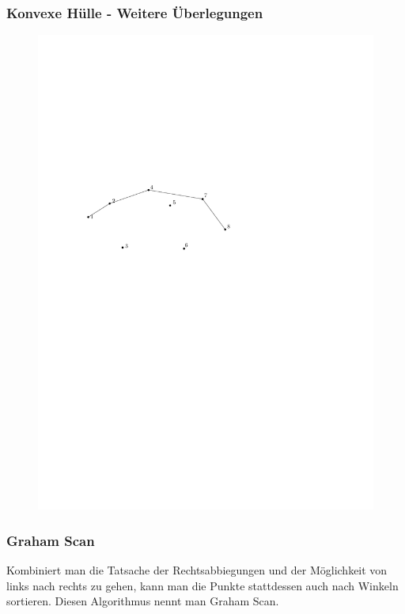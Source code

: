 \begin{frame}
	\frametitle{{Konvexe Hülle - Weitere Überlegungen}}
\begin{figure}[htbp]
	\begin{center}
  	\includegraphics[width=.8\linewidth]{bilder/graham9}
	\end{center}
\end{figure}
\end{frame}

\begin{frame}
	\frametitle{Graham Scan}
	Kombiniert man die Tatsache der Rechtsabbiegungen und der Möglichkeit von links nach rechts zu gehen, kann man die Punkte stattdessen auch nach Winkeln sortieren. Diesen Algorithmus nennt man Graham Scan.
\end{frame}

